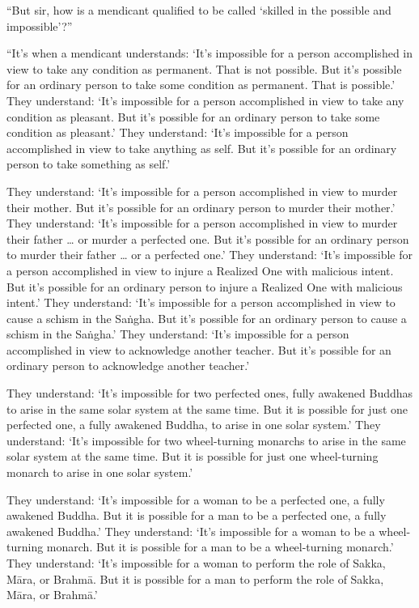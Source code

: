 \documentclass[12pt,openany]{book}%
\begin{document}
“But sir, how is a mendicant qualified to be called ‘skilled in the possible and impossible’?” 

“It’s when a mendicant understands: ‘It’s impossible for a person accomplished in view to take any condition as permanent. That is not possible. But it’s possible for an ordinary person to take some condition as permanent. That is possible.’ They understand: ‘It’s impossible for a person accomplished in view to take any condition as pleasant. But it’s possible for an ordinary person to take some condition as pleasant.’ They understand: ‘It’s impossible for a person accomplished in view to take anything as self. But it’s possible for an ordinary person to take something as self.’ 

They understand: ‘It’s impossible for a person accomplished in view to murder their mother. But it’s possible for an ordinary person to murder their mother.’ They understand: ‘It’s impossible for a person accomplished in view to murder their father … or murder a perfected one. But it’s possible for an ordinary person to murder their father … or a perfected one.’ They understand: ‘It’s impossible for a person accomplished in view to injure a Realized One with malicious intent. But it’s possible for an ordinary person to injure a Realized One with malicious intent.’ They understand: ‘It’s impossible for a person accomplished in view to cause a schism in the \textsanskrit{Saṅgha}. But it’s possible for an ordinary person to cause a schism in the \textsanskrit{Saṅgha}.’ They understand: ‘It’s impossible for a person accomplished in view to acknowledge another teacher. But it’s possible for an ordinary person to acknowledge another teacher.’ 

They understand: ‘It’s impossible for two perfected ones, fully awakened Buddhas to arise in the same solar system at the same time. But it is possible for just one perfected one, a fully awakened Buddha, to arise in one solar system.’ They understand: ‘It’s impossible for two wheel-turning monarchs to arise in the same solar system at the same time. But it is possible for just one wheel-turning monarch to arise in one solar system.’ 

They understand: ‘It’s impossible for a woman to be a perfected one, a fully awakened Buddha. But it is possible for a man to be a perfected one, a fully awakened Buddha.’ They understand: ‘It’s impossible for a woman to be a wheel-turning monarch. But it is possible for a man to be a wheel-turning monarch.’ They understand: ‘It’s impossible for a woman to perform the role of Sakka, \textsanskrit{Māra}, or \textsanskrit{Brahmā}. But it is possible for a man to perform the role of Sakka, \textsanskrit{Māra}, or \textsanskrit{Brahmā}.’ 
\end{document}
